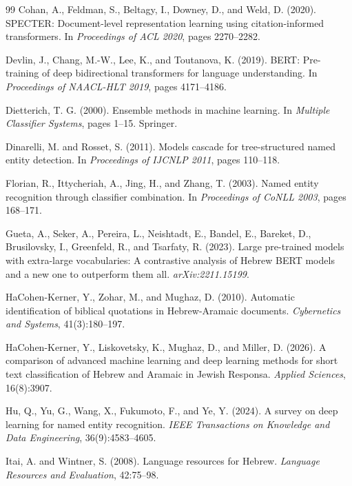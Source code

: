 \documentclass[12pt,a4paper]{report}
\begin{document}
\begin{thebibliography}{99}
Cohan, A., Feldman, S., Beltagy, I., Downey, D., and Weld, D. (2020).
SPECTER: Document-level representation learning using citation-informed transformers.
In \emph{Proceedings of ACL 2020}, pages 2270--2282.

Devlin, J., Chang, M.-W., Lee, K., and Toutanova, K. (2019).
BERT: Pre-training of deep bidirectional transformers for language understanding.
In \emph{Proceedings of NAACL-HLT 2019}, pages 4171--4186.

Dietterich, T. G. (2000).
Ensemble methods in machine learning.
In \emph{Multiple Classifier Systems}, pages 1--15. Springer.

Dinarelli, M. and Rosset, S. (2011).
Models cascade for tree-structured named entity detection.
In \emph{Proceedings of IJCNLP 2011}, pages 110--118.

Florian, R., Ittycheriah, A., Jing, H., and Zhang, T. (2003).
Named entity recognition through classifier combination.
In \emph{Proceedings of CoNLL 2003}, pages 168--171.

Gueta, A., Seker, A., Pereira, L., Neishtadt, E., Bandel, E., Bareket, D., Brusilovsky, I., Greenfeld, R., and Tsarfaty, R. (2023).
Large pre-trained models with extra-large vocabularies: A contrastive analysis of Hebrew BERT models and a new one to outperform them all.
\emph{arXiv:2211.15199}.

HaCohen-Kerner, Y., Zohar, M., and Mughaz, D. (2010).
Automatic identification of biblical quotations in Hebrew-Aramaic documents.
\emph{Cybernetics and Systems}, 41(3):180--197.

HaCohen-Kerner, Y., Liskovetsky, K., Mughaz, D., and Miller, D. (2026).
A comparison of advanced machine learning and deep learning methods for short text classification of Hebrew and Aramaic in Jewish Responsa.
\emph{Applied Sciences}, 16(8):3907.

Hu, Q., Yu, G., Wang, X., Fukumoto, F., and Ye, Y. (2024).
A survey on deep learning for named entity recognition.
\emph{IEEE Transactions on Knowledge and Data Engineering}, 36(9):4583--4605.

Itai, A. and Wintner, S. (2008).
Language resources for Hebrew.
\emph{Language Resources and Evaluation}, 42:75--98.


\end{thebibliography}
\end{document}
